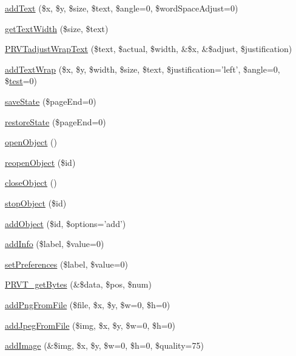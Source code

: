 \begin{DoxyCompactItemize}
\item 
\hyperlink{class_cpdf_a3f30e13975f37e15fbbfe69595cb3731}{add\-Text} (\$x, \$y, \$size, \$text, \$angle=0, \$word\-Space\-Adjust=0)
\item 
\hyperlink{class_cpdf_af92fe5c611b3feeafd3282ace477345f}{get\-Text\-Width} (\$size, \$text)
\item 
\hyperlink{class_cpdf_aa809699a6b3919f44b4d62e5f685dc8e}{\-P\-R\-V\-Tadjust\-Wrap\-Text} (\$text, \$actual, \$width, \&\$x, \&\$adjust, \$justification)
\item 
\hyperlink{class_cpdf_a3addbbcd4f33f737fa3210e38d7c3649}{add\-Text\-Wrap} (\$x, \$y, \$width, \$size, \$text, \$justification='left', \$angle=0, \$\hyperlink{classtest}{test}=0)
\item 
\hyperlink{class_cpdf_a854f2a9d1250c69b6c2243d5175ddd83}{save\-State} (\$page\-End=0)
\item 
\hyperlink{class_cpdf_a2f42f38b51682f8457ee605bb3029dc4}{restore\-State} (\$page\-End=0)
\item 
\hyperlink{class_cpdf_aa4a5e13c4e4e38cab679bef2100f5a1b}{open\-Object} ()
\item 
\hyperlink{class_cpdf_a42c738c855a15be14e5fe6b07834a6c5}{reopen\-Object} (\$id)
\item 
\hyperlink{class_cpdf_afab1d53fba022d6a3cfa2c7ce3168106}{close\-Object} ()
\item 
\hyperlink{class_cpdf_ae592038df692dd6d0cfca2f781e6b0ae}{stop\-Object} (\$id)
\item 
\hyperlink{class_cpdf_a61fb160b67eb6fae0fa444ba22ecb5e0}{add\-Object} (\$id, \$options='add')
\item 
\hyperlink{class_cpdf_a86a12337c5d465a21d8f8f998d12bf7d}{add\-Info} (\$label, \$value=0)
\item 
\hyperlink{class_cpdf_abfa522165e81ef739cd49cf26ffab7ed}{set\-Preferences} (\$label, \$value=0)
\item 
\hyperlink{class_cpdf_a92ee2fbcc0af6cfb8ad13c3ff171747b}{\-P\-R\-V\-T\-\_\-get\-Bytes} (\&\$data, \$pos, \$num)
\item 
\hyperlink{class_cpdf_a14d94ee9d3ce15f6f24b0b8950acf26a}{add\-Png\-From\-File} (\$file, \$x, \$y, \$w=0, \$h=0)
\item 
\hyperlink{class_cpdf_ad14d18b56e5418e5938c36e16aba551d}{add\-Jpeg\-From\-File} (\$img, \$x, \$y, \$w=0, \$h=0)
\item 
\hyperlink{class_cpdf_a38148d27bd5f2fdd2b63c382991e03fa}{add\-Image} (\&\$img, \$x, \$y, \$w=0, \$h=0, \$quality=75)
\item 

\end{DoxyCompactItemize}
